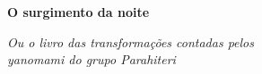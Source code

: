 


\begingroup\thispagestyle{empty}\vspace*{.05\textheight} 

              \formular
              \Huge
              \noindent
              \textbf{O surgimento da noite}
              
              \vspace{0.3em}

              \noindent\large\textit{Ou o livro das transformações contadas pelos\\ yanomami do  grupo Parahiteri}
                    
\endgroup
\vfill
\pagebreak